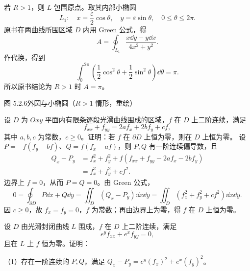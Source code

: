 若 $R>1$，则 $L$ 包围原点。取其内部小椭圆
\[
L_1:\quad x=\frac\varepsilon2\cos\theta,\quad y=\varepsilon\sin\theta,\quad0\le\theta\le2\pi.
\]
原书在两曲线所围区域 $D$ 内用 Green 公式，得
\[
A=\oint_{L_1}\frac{x\dd y-y\dd x}{4x^2+y^2}.
\]
作代换，得到
\[
\int_0^{2\pi}\left(\frac12\cos^2\theta+\frac12\sin^2\theta\right)\dd\theta=\pi.
\]
所以原书结论为 $R>1$ 时 $A=\pi$。
\begin{center}\begin{minipage}{\linewidth}\centering
{}\par{\small 图 5.2.6\quad 外圆与小椭圆（$R>1$ 情形，重绘）}
\end{minipage}\end{center}

设 $D$ 为 $Oxy$ 平面内有限条逐段光滑曲线围成的区域，$f$ 在 $D$ 上二阶连续，满足
\[
f_{xx}+f_{yy}=2af_x+2bf_y+cf,
\]
其中 $a,b,c$ 为常数，$c\ge0$。证明：若 $f$ 在 $\partial D$ 上恒为零，则在 $D$ 上恒为零。
\prooftext 设 $P=-f(f_y-bf)$、$Q=f(f_x-af)$，则 $P,Q$ 有一阶连续偏导数，且
\begin{align*}
Q_x-P_y&=f_x^2+f_y^2+f(f_{xx}+f_{yy}-2af_x-2bf_y)\\
&=f_x^2+f_y^2+cf^2.
\end{align*}
边界上 $f=0$，从而 $P=Q=0$。由 Green 公式，
\[
0=\oint_{\partial D}P\dd x+Q\dd y
=\iint_D(Q_x-P_y)\dd x\dd y
=\iint_D(f_x^2+f_y^2+cf^2)\dd x\dd y.
\]
因 $c\ge0$，故 $f_x=f_y=0$，$f$ 为常数；再由边界上为零，得 $f$ 在 $D$ 上恒为零。

设 $D$ 由光滑封闭曲线 $L$ 围成，$f$ 在 $D$ 上二阶连续，满足
\[
e^yf_{xx}+e^xf_{yy}=0,
\]
且在 $L$ 上 $f$ 恒为零。证明：

（1）存在一阶连续的 $P,Q$，满足 $Q_x-P_y=e^y(f_x)^2+e^x(f_y)^2$。

